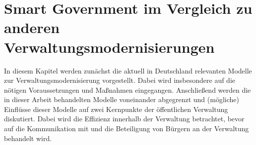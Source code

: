 \section{Smart Government im Vergleich zu anderen Verwaltungsmodernisierungen}
In diesem Kapitel werden zunächst die aktuell in Deutschland relevanten Modelle zur Verwaltungsmodernisierung vorgestellt.
Dabei wird insbesondere auf die nötigen Voraussetzungen und Maßnahmen eingegangen.
Anschließend werden die in dieser Arbeit behandelten Modelle voneinander abgegrenzt und (mögliche) Einflüsse dieser Modelle auf zwei Kernpunkte der öffentlichen Verwaltung diskutiert.
Dabei wird die Effizienz innerhalb der Verwaltung betrachtet, bevor auf die Kommunikation mit und die Beteiligung von Bürgern an der Verwaltung behandelt wird.

\clearpage


